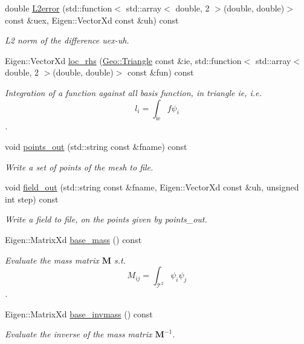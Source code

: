 \begin{DoxyCompactItemize}
double \hyperlink{classTspeed_1_1FESpace_a82f14839c97266bc4ba1448b59398aad}{L2error} (std\-::function$<$ std\-::array$<$ double, 2 $>$(double, double)$>$ const \&uex, Eigen\-::\-Vector\-Xd const \&uh) const 
\begin{DoxyCompactList}\small\item\em L2 norm of the difference uex-\/uh. \end{DoxyCompactList}\item 
Eigen\-::\-Vector\-Xd \hyperlink{classTspeed_1_1FESpace_a0336e65ff3cbd3e2ffa948750e3ce805}{loc\-\_\-rhs} (\hyperlink{classTspeed_1_1Geo_1_1Triangle}{Geo\-::\-Triangle} const \&ie, std\-::function$<$ std\-::array$<$ double, 2 $>$(double, double)$>$ const \&fun) const 
\begin{DoxyCompactList}\small\item\em Integration of a function against all basis function, in triangle ie, i.\-e. \[ l_i = \int_\mathrm{ie} f \psi_i \]. \end{DoxyCompactList}\item 
void \hyperlink{classTspeed_1_1FESpace_ad92a40f39edfb095b42bc6389b11d78f}{points\-\_\-out} (std\-::string const \&fname) const 
\begin{DoxyCompactList}\small\item\em Write a set of points of the mesh to file. \end{DoxyCompactList}\item 
void \hyperlink{classTspeed_1_1FESpace_a72a024911d1a650c078e0bfc66ccc837}{field\-\_\-out} (std\-::string const \&fname, Eigen\-::\-Vector\-Xd const \&uh, unsigned int step) const 
\begin{DoxyCompactList}\small\item\em Write a field to file, on the points given by points\-\_\-out. \end{DoxyCompactList}\item 
Eigen\-::\-Matrix\-Xd \hyperlink{classTspeed_1_1FESpace_ab78f6ab6c66a321d925f5f989a8ded1f}{base\-\_\-mass} () const 
\begin{DoxyCompactList}\small\item\em Evaluate the mass matrix $\mathbf{M}$ s.\-t. \[ M_{ij} = \int_{\mathcal{T}^2} \psi_i \psi_j\]. \end{DoxyCompactList}\item 
Eigen\-::\-Matrix\-Xd \hyperlink{classTspeed_1_1FESpace_a0a6366236da7e30ee9f9c560c9d077f1}{base\-\_\-invmass} () const 
\begin{DoxyCompactList}\small\item\em Evaluate the inverse of the mass matrix $ \mathbf{M}^{-1} $. \end{DoxyCompactList}\end{DoxyCompactItemize}
